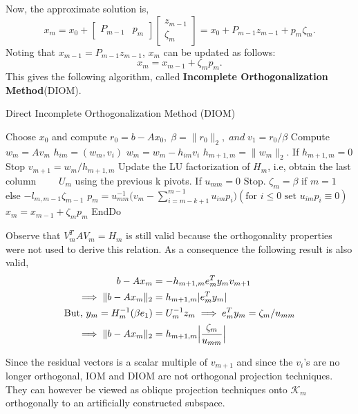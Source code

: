 \documentclass[10pt,a4paper]{article}
\begin{document}
Now, the approximate solution is,
$$x_m=x_0+\left[ \begin{array}{cc} P_{m-1} & p_m \end{array} \right]\left[ \begin{array}{c} z_{m-1} \\ \zeta_m \end{array} \right]=x_0+P_{m-1}z_{m-1}+p_m\zeta_m.$$
Noting that $x_{m-1}=P_{m-1}z_{m-1}$, $x_m$ can be updated as follows:
$$x_m=x_{m-1}+\zeta_mp_m.$$
This gives the following algorithm, called \textbf{Incomplete Orthogonalization Method}(DIOM).

\begin{algorithm}
\caption{Direct Incomplete Orthogonalization Method (DIOM)}
\begin{algorithmic}[1]
\State Choose $x_0$ and compute $r_0=b-Ax_0,\;\beta=\|r_0\|_2,\;and\;v_1=r_0/\beta$
	\State Compute $w_m = Av_m$
		\State $h_{im} = (w_m,v_i)$
		\State $w_m = w_m - h_{im}v_i$
	\EndFor
	\State $h_{m+1,m} = \|w_m\|_2$. If $h_{m+1,m}=0$ Stop
	\State $v_{m+1}=w_m/h_{m+1,m}$
	\State Update the LU factorization of $H_m$, i.e, obtain the last column 	
	\State $\qquad U_m$ using the previous k pivots. If $u_{mm}=0$ Stop.
	\State $\zeta_m = \beta$ if $m=1$ else $-l_{m,m-1}\zeta_{m-1}$
	\State $p_m = u^{-1}_{mm}\Big( v_m-\sum^{m-1}_{i=m-k+1}u_{im}p_i \Big)(\text{for }i\le0\text{ set }u_{im}p_i\equiv0)$
	\State $x_m=x_{m-1}+\zeta_mp_m$
\EndFor
\State EndDo
\end{algorithmic}
\end{algorithm}

\begin{remark}
Observe that $V^T_mAV_m=H_m$ is still valid because the orthogonality properties were not used to derive this relation. As a consequence the following result  is also valid,
\begin{align*}
b-Ax_m &= -h_{m+1,m}e^T_my_mv_{m+1} \\
\implies \|b-Ax_m\|_2 &= h_{m+1,m}|e^T_my_m| \\
\text{But, }y_m = H^{-1}_m(\beta	e_1) &= U^{-1}_mz_m \implies e^T_my_m = \zeta_m/u_{mm} \\
\implies \|b-Ax_m\|_2 &= h_{m+1,m}\Bigl|\frac{\zeta_m}{u_{mm}}\Bigr|
\end{align*}
\end{remark}

Since the residual vectors is a scalar multiple of $v_{m+1}$ and since the $v_i$'s are no longer orthogonal, IOM and DIOM are not orthogonal projection techniques. They can however be viewed as oblique projection techniques onto $\mathcal{K}_m$ orthogonally to an artificially constructed subspace.
\end{document}
